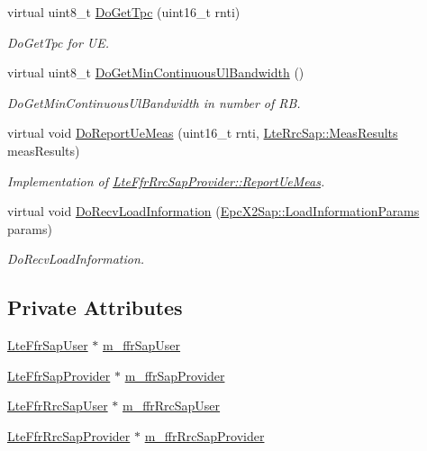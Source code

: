 \begin{DoxyCompactItemize}
virtual uint8\+\_\+t \hyperlink{classns3_1_1LteFrNoOpAlgorithm_a693679c0a78776a6e0f5f702478e05b1}{Do\+Get\+Tpc} (uint16\+\_\+t rnti)
\begin{DoxyCompactList}\small\item\em Do\+Get\+Tpc for UE. \end{DoxyCompactList}\item 
virtual uint8\+\_\+t \hyperlink{classns3_1_1LteFrNoOpAlgorithm_abac28fa24a78a4f758e5c3dcf48064ec}{Do\+Get\+Min\+Continuous\+Ul\+Bandwidth} ()
\begin{DoxyCompactList}\small\item\em Do\+Get\+Min\+Continuous\+Ul\+Bandwidth in number of RB. \end{DoxyCompactList}\item 
virtual void \hyperlink{classns3_1_1LteFrNoOpAlgorithm_aba7aefa833108607fbdd574b657156f2}{Do\+Report\+Ue\+Meas} (uint16\+\_\+t rnti, \hyperlink{structns3_1_1LteRrcSap_1_1MeasResults}{Lte\+Rrc\+Sap\+::\+Meas\+Results} meas\+Results)
\begin{DoxyCompactList}\small\item\em Implementation of \hyperlink{classns3_1_1LteFfrRrcSapProvider_aefa0779641b8432a7d3406b519ca7e59}{Lte\+Ffr\+Rrc\+Sap\+Provider\+::\+Report\+Ue\+Meas}. \end{DoxyCompactList}\item 
virtual void \hyperlink{classns3_1_1LteFrNoOpAlgorithm_afe1b8b3b56b0cdcd1efe2507fbd367a5}{Do\+Recv\+Load\+Information} (\hyperlink{structns3_1_1EpcX2Sap_1_1LoadInformationParams}{Epc\+X2\+Sap\+::\+Load\+Information\+Params} params)
\begin{DoxyCompactList}\small\item\em Do\+Recv\+Load\+Information. \end{DoxyCompactList}\end{DoxyCompactItemize}
\subsection*{Private Attributes}
\begin{DoxyCompactItemize}
\item 
\hyperlink{classns3_1_1LteFfrSapUser}{Lte\+Ffr\+Sap\+User} $\ast$ \hyperlink{classns3_1_1LteFrNoOpAlgorithm_aef5463abfede443a5a1f0aa0bc623e11}{m\+\_\+ffr\+Sap\+User}
\item 
\hyperlink{classns3_1_1LteFfrSapProvider}{Lte\+Ffr\+Sap\+Provider} $\ast$ \hyperlink{classns3_1_1LteFrNoOpAlgorithm_a088d792e6df4a86c44c7de816902b7e0}{m\+\_\+ffr\+Sap\+Provider}
\item 
\hyperlink{classns3_1_1LteFfrRrcSapUser}{Lte\+Ffr\+Rrc\+Sap\+User} $\ast$ \hyperlink{classns3_1_1LteFrNoOpAlgorithm_a11f64887579f035d97b0d2bde9f5499c}{m\+\_\+ffr\+Rrc\+Sap\+User}
\item 
\hyperlink{classns3_1_1LteFfrRrcSapProvider}{Lte\+Ffr\+Rrc\+Sap\+Provider} $\ast$ \hyperlink{classns3_1_1LteFrNoOpAlgorithm_aa0b6cba0e6934edb2392cbde6129da1a}{m\+\_\+ffr\+Rrc\+Sap\+Provider}
\end{DoxyCompactItemize}
